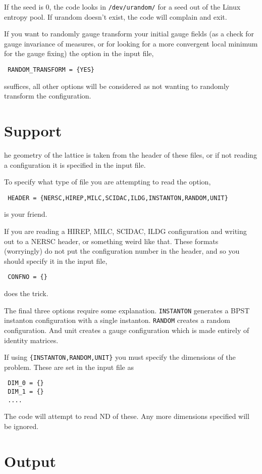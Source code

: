 \documentclass[12pt]{article}
\begin{document}
If the seed is 0, the code looks in \verb|/dev/urandom/| for a seed out of the Linux entropy pool. If urandom doesn't exist, the code will complain and exit.

If you want to randomly gauge transform your initial gauge fields (as a check for gauge invariance of measures, or for looking for a more convergent local minimum for the gauge fixing) the option in the input file,
\begin{verbatim}
 RANDOM_TRANSFORM = {YES}
\end{verbatim}
ssuffices, all other options will be considered as not wanting to randomly transform the configuration.

\section{Support}

he geometry of the lattice is taken from the header of these files, or if not reading a configuration it is specified in the input file.

To specify what type of file you are attempting to read the option,
\begin{verbatim}
 HEADER = {NERSC,HIREP,MILC,SCIDAC,ILDG,INSTANTON,RANDOM,UNIT}
\end{verbatim}
is your friend.

If you are reading a HIREP, MILC, SCIDAC, ILDG configuration and writing out to a NERSC header, or something weird like that. These formats (worryingly) do not put the configuration number in the header, and so you should specify it in the input file,
\begin{verbatim}
 CONFNO = {}
\end{verbatim}
does the trick.

The final three options require some explanation. \verb|INSTANTON|  generates a BPST instanton configuration with a single instanton. \verb|RANDOM| creates a random configuration. And unit creates a gauge configuration which is made entirely of identity matrices.

If using \verb|{INSTANTON,RANDOM,UNIT}| you must specify the dimensions of the problem. These are set in the input file as
\begin{verbatim}
 DIM_0 = {}
 DIM_1 = {}
 ....
\end{verbatim}
The code will attempt to read ND of these. Any more dimensions specified will be ignored.

\section{Output}
\end{document}

